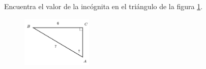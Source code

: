 \question[15]  Encuentra el valor de la incógnita en el triángulo de la figura \ref{fig:angle_functrig_05}.
\begin{figure}[H]
    \begin{center}
        \includegraphics[width=0.3\textwidth]{../images/angle_functrig_05.png}
    \end{center}
    \caption{}
    \label{fig:angle_functrig_05}
\end{figure}